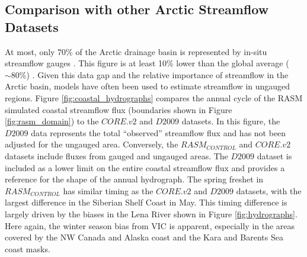 \documentclass[jgrga, draft]{agutex}
\begin{document}
\begin{article}
\subsection{Comparison with other Arctic Streamflow Datasets}
\label{sec:coastal_streamflow}

At most, only 70\% of the Arctic drainage basin is represented by in-situ streamflow gauges \citep{Shiklomanov_2000}.
This figure is at least 10\% lower than the global average ($\sim 80\%$) \citep{Dai_2009}.
Given this data gap and the relative importance of streamflow in the Arctic basin, models have often been used to estimate streamflow in ungauged regions.
Figure \ref{fig:coastal_hydrographs} compares the annual cycle of the RASM simulated coastal streamflow flux (boundaries shown in Figure \ref{fig:rasm_domain}) to the $CORE.v2$ and $D2009$ datasets.
In this figure, the $D2009$ data represents the total ``observed'' streamflow flux and has not been adjusted for the ungauged area.
Conversely, the $RASM_{CONTROL}$ and $CORE.v2$ datasets include fluxes from gauged and ungauged areas.
The $D2009$ dataset is included as a lower limit on the entire coastal streamflow flux and provides a reference for the shape of the annual hydrograph.
The spring freshet in $RASM_{CONTROL}$ has similar timing as the $CORE.v2$ and $D2009$ datasets, with the largest difference in the Siberian Shelf Coast in May.
This timing difference is largely driven by the biases in the Lena River shown in Figure \ref{fig:hydrographs}.
Here again, the winter season bias from VIC is apparent, especially in the areas covered by the NW Canada and Alaska coast and the Kara and Barents Sea coast masks.


\end{article}
\end{document}
